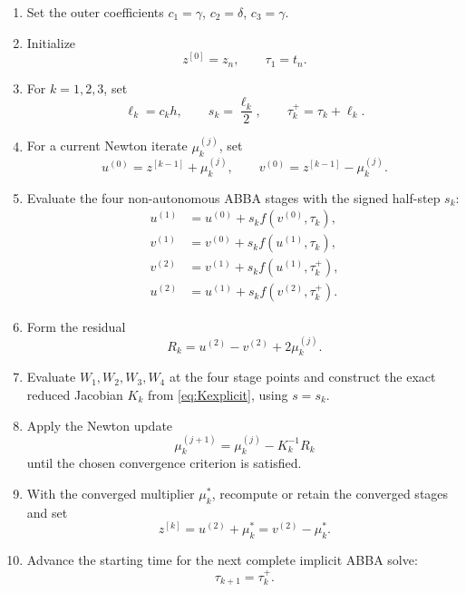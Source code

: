 \documentclass[11pt,a4paper]{article}
\begin{document}
\begin{enumerate}[label=\textbf{\arabic*.},leftmargin=1.0cm,itemsep=0.5em]
    \item Set the outer coefficients $c_1=\gamma$, $c_2=\delta$, $c_3=\gamma$.

    \item Initialize
    \begin{equation}
        z^{[0]}=z_n,
        \qquad
        \tau_1=t_n.
    \end{equation}

    \item For $k=1,2,3$, set
    \begin{equation}
        \ell_k=c_kh,
        \qquad
        s_k=\frac{\ell_k}{2},
        \qquad
        \tau_k^+=\tau_k+\ell_k.
    \end{equation}

    \item For a current Newton iterate $\mu_k^{(j)}$, set
    \begin{equation}
        u^{(0)}=z^{[k-1]}+\mu_k^{(j)},
        \qquad
        v^{(0)}=z^{[k-1]}-\mu_k^{(j)}.
    \end{equation}

    \item Evaluate the four non-autonomous ABBA stages with the signed half-step $s_k$:
    \begin{align*}
        u^{(1)}&=u^{(0)}+s_kf(v^{(0)},\tau_k),\\
        v^{(1)}&=v^{(0)}+s_kf(u^{(1)},\tau_k),\\
        v^{(2)}&=v^{(1)}+s_kf(u^{(1)},\tau_k^+),\\
        u^{(2)}&=u^{(1)}+s_kf(v^{(2)},\tau_k^+).
    \end{align*}

    \item Form the residual
    \begin{equation}
        R_k=u^{(2)}-v^{(2)}+2\mu_k^{(j)}.
    \end{equation}

    \item Evaluate $W_1,W_2,W_3,W_4$ at the four stage points and construct the exact reduced Jacobian $K_k$ from \eqref{eq:Kexplicit}, using $s=s_k$.

    \item Apply the Newton update
    \begin{equation}
        \mu_k^{(j+1)}=\mu_k^{(j)}-K_k^{-1}R_k
    \end{equation}
    until the chosen convergence criterion is satisfied.

    \item With the converged multiplier $\mu_k^*$, recompute or retain the converged stages and set
    \begin{equation}
        z^{[k]}=u^{(2)}+\mu_k^*=v^{(2)}-\mu_k^*.
    \end{equation}

    \item Advance the starting time for the next complete implicit ABBA solve:
    \begin{equation}
        \tau_{k+1}=\tau_k^+.
    \end{equation}
\end{enumerate}
\end{document}
